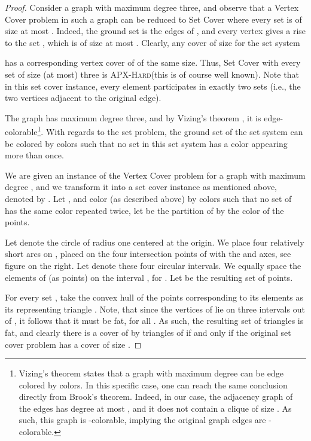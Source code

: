 \documentclass[12pt]{article}
\theoremstyle{remark}\theoremheaderfont{\sf}\theorembodyfont{\upshape}
\numberwithin{figure}{section}\numberwithin{table}{section}\numberwithin{equation}{section}
\newcommand{\ProblemC}[1]{\textsf{#1}}
\providecommand{\ComplexityClass}[1]{{{\textcolor[named]{ColorComplexityClass}{\textsc{#1}}}}}
\newcommand{\APXHard}{\ComplexityClass{APX-Hard}\xspace}
\newcommand{\IncludeGraphics}[2][]{\typeout{}\typeout{Graphics: #2}\typeout{\ includegraphics[#1]{#2}}\texttt{[image: \#2]}
  \typeout{}}
\begin{document}
\begin{proof}
  Consider a graph  with maximum degree three, and observe
  that a \ProblemC{Vertex Cover} problem in such a graph can be
  reduced to \ProblemC{Set Cover} where every set is of size at most
  . Indeed, the ground set  is the edges of , and every
  vertex  gives a rise to the set
  ,
  which is of size at most . Clearly, any cover  of size  for
  the set system
  
  has a corresponding vertex cover of  of the same size. Thus,
  \ProblemC{Set Cover} with every set of size (at most) three is
  \APXHard (this is of course well known). Note that in this set cover
  instance, every element participates in exactly two sets (i.e., the
  two vertices adjacent to the original edge).

  The graph  has maximum degree three, and by Vizing's theorem
  \cite{bm-gta-76}, it is  edge-colorable\footnote{Vizing's theorem
    states that a graph with maximum degree  can be edge
    colored by  colors. In this specific case, one can reach
    the same conclusion directly from Brook's theorem. Indeed, in our
    case, the adjacency graph of the edges has degree at most , and
    it does not contain a clique of size . As such, this graph is
    -colorable, implying the original graph edges are
    -colorable.}.  With regards to the set problem, the ground set
  of the set system  can be colored by  colors such
  that no set in this set system has a color appearing more than once.

  We are given an instance of the \ProblemC{Vertex Cover} problem for
  a graph with maximum degree , and we transform it into a set
  cover instance as mentioned above, denoted by
  . Let
  , and color  (as described above) by  colors
  such that no set of  has the same color repeated twice,
  let  be the partition of  by the color of the
  points.

  \parpic[r]{\IncludeGraphics{figs/8_way}}
  Let  denote the circle of radius one centered at the
  origin. We place four relatively short arcs on , placed on the
  four intersection points of  with the  and  axes, see
  figure on the right.  Let  denote these four
  circular intervals.  We equally space the elements of  (as
  points) on the interval , for . Let 
  be the resulting set of points.


  For every set , take the convex hull of
  the points corresponding to its elements as its representing
  triangle . Note, that since the vertices of  lie on three
  intervals out of , it follows that it must be
  fat, for all . As such, the resulting
  set of triangles
   is fat, and
  clearly there is a cover of  by  triangles of 
  if and only if the original set cover problem has a cover of size
  .



\end{proof}
\end{document}
